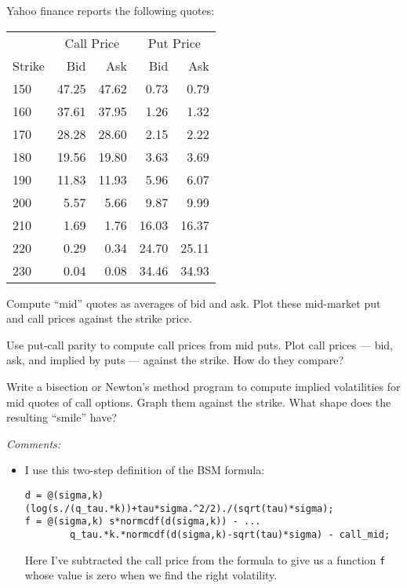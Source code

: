 \documentclass[11pt]{exam}
\begin{document}
\begin{questions}
Yahoo finance reports the following quotes:
%
\begin{center}
\tabcolsep=0.15in
\begin{tabular}{lrrrr}
\toprule
      &  \multicolumn{2}{c}{\phantom{x}Call Price} &  \multicolumn{2}{c}{\phantom{xx}Put Price}  \\
Strike    &  Bid & Ask &  Bid & Ask  \\
\midrule
150 &  47.25  &  47.62 &  0.73  &  0.79 \\
160 &  37.61  &  37.95 &  1.26  &  1.32 \\
170 &  28.28  &  28.60 &  2.15  &  2.22 \\
180 &  19.56  &  19.80 &  3.63  &  3.69 \\
190 &  11.83  &  11.93 &  5.96  &  6.07 \\
200 &   5.57  &   5.66 &  9.87  &  9.99 \\
210 &   1.69  &   1.76 & 16.03  & 16.37 \\
220 &   0.29  &   0.34 & 24.70  & 25.11 \\
230 &   0.04  &   0.08 & 34.46  & 34.93 \\
\bottomrule
\end{tabular}
\end{center}

\begin{parts}
\item Compute ``mid'' quotes as averages of bid and ask.
Plot these mid-market put and call prices against the strike price.

\item Use put-call parity to compute call prices from mid puts.
Plot call prices --- bid, ask, and implied by puts ---
against the strike.
How do they compare?

\item Write a bisection or Newton's method program
to compute implied volatilities for mid quotes of call options.
Graph them against the strike.
What shape does the resulting ``smile'' have?
\end{parts}
{\it Comments:
\begin{itemize}
\item I use this two-step definition of the BSM formula:
\begin{verbatim}
d = @(sigma,k) (log(s./(q_tau.*k))+tau*sigma.^2/2)./(sqrt(tau)*sigma);
f = @(sigma,k) s*normcdf(d(sigma,k)) - ...
        q_tau.*k.*normcdf(d(sigma,k)-sqrt(tau)*sigma) - call_mid;
\end{verbatim}
Here I've subtracted the call price from the formula to give us a
function {\tt f} whose value is zero when we find the right volatility.


\end{itemize}}
\end{questions}
\end{document}

